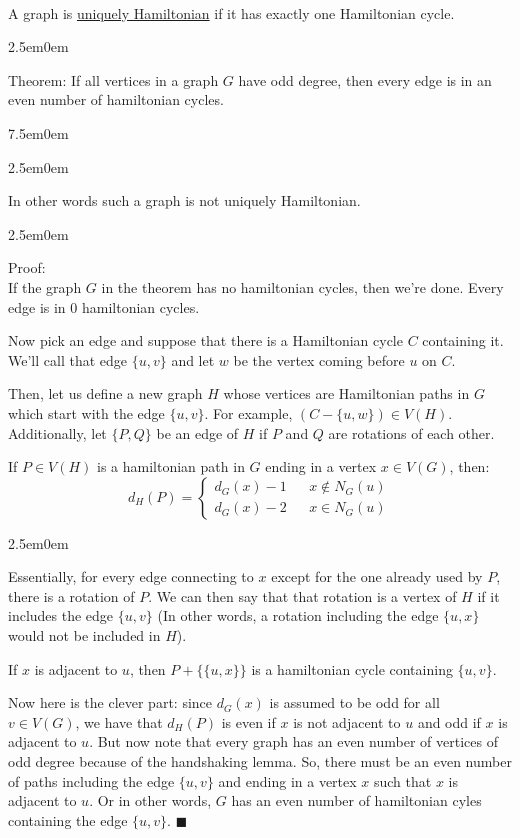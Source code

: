 \documentclass{book}
\newcommand{\hTwo}{%
   \color{MidnightBlue}%
   \fontsize{13}{15}\selectfont%
}
\newcommand{\hThree}{%
   \color{PineGreen}
   \fontsize{13}{15}\selectfont%
}
\newcommand{\hFour}{%
   \color{Cerulean}
   \fontsize{12}{14}\selectfont%
}
\newcommand{\teachComment}{
   \color{Orange}%
   \fontsize{12}{14}\selectfont%
}
\newenvironment{myIndent}{%
   \begin{adjustwidth}{2.5em}{0em}%
}{%
   \end{adjustwidth}%
}
\newenvironment{myTindent}{%
   \begin{adjustwidth}{7.5em}{0em}%
}{%
   \end{adjustwidth}%
}
\newcommand{\udefine}[1]{{%
   \setulcolor{Red}%
   \setul{0.14em}{0.07em}%
   \ul{#1}%
}}
\newcommand{\uuline}[2][.]{%
{\vphantom{a}\color{#1}%
\rlap{\rule[-0.18em]{\widthof{#2}}{0.06em}}%
\rlap{\rule[-0.32em]{\widthof{#2}}{0.06em}}}%
#2}
\newcommand{\mySepTwo}[1][.]{%
   {\noindent\color{#1}{\rule{6.5in}{0.5mm}}}\\%
}
\newcommand{\retTwo}{\hfill\bigbreak}
\begin{document}
\mySepTwo

A graph is \udefine{uniquely Hamiltonian} if it has exactly one Hamiltonian cycle. \retTwo

{\begin{myIndent} \hTwo
   \uuline{Theorem}: If all vertices in a graph $G$ have odd degree, then every edge is in an even number of hamiltonian cycles.
   
   {\begin{myTindent}\begin{myIndent} \teachComment
      In other words such a graph is not uniquely Hamiltonian. \retTwo
   \end{myIndent}\end{myTindent}}
   {\begin{myIndent} \hThree
      Proof: \\
      If the graph $G$ in the theorem has no hamiltonian cycles, then we're done. Every edge is in $0$ hamiltonian cycles. \retTwo

      Now pick an edge and suppose that there is a Hamiltonian cycle $C$ containing it. We'll call that edge $\{u, v\}$ and let $w$ be the vertex coming before $u$ on $C$. \retTwo
      
      Then, let us define a new graph $H$ whose vertices are Hamiltonian paths in $G$ which start with the edge $\{u, v\}$. For example, $(C - \{u, w\}) \in V(H)$. Additionally, let $\{P, Q\}$ be an edge of $H$ if $P$ and $Q$ are rotations of each other. \retTwo

      If $P \in V(H)$ is a hamiltonian path in $G$ ending in a vertex $x \in V(G)$, then: \[d_H(P) = \left\{\begin{matrix}
         d_G(x) - 1 & & x \notin N_G(u) \\
         d_G(x) - 2 & & x \in N_G(u)
      \end{matrix}\right.\]
      {\begin{myIndent} \hFour
         Essentially, for every edge connecting to $x$ except for the one already used by $P$, there is a rotation of $P$. We can then say that that rotation is a vertex of $H$ if it includes the edge $\{u, v\}$ (In other words, a rotation including the edge $\{u, x\}$ would not be included in $H$).
      \end{myIndent}}

      \retTwo
      If $x$ is adjacent to $u$, then $P + \{\{u, x\}\}$ is a hamiltonian cycle containing $\{u, v\}$. \retTwo

      Now here is the clever part: since $d_G(x)$ is assumed to be odd for all \\$v \in V(G)$, we have that $d_H(P)$ is even if $x$ is not adjacent to $u$ and odd if $x$ is adjacent to $u$. But now note that every graph has an even number of vertices of odd degree because of the handshaking lemma. So, there must be an even number of paths including the edge $\{u, v\}$ and ending in a vertex $x$ such that $x$ is adjacent to $u$. Or in other words, $G$ has an even number of hamiltonian cyles containing the edge $\{u, v\}$. $\blacksquare$
   \end{myIndent}}
\end{myIndent}} \retTwo
\end{document}
